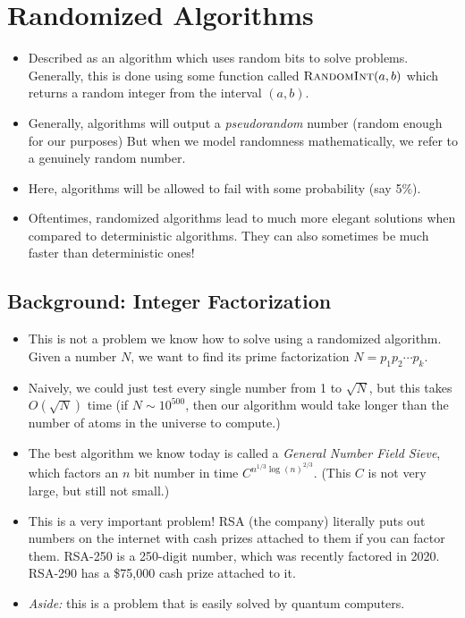 \section{Randomized Algorithms} 
\begin{itemize}
	\item Described as an algorithm which uses random bits to solve problems. Generally, this is done 
		using some function called \( \textsc{RandomInt}(a, b) \) which returns a random integer from 
		the interval \( (a, b) \).
	\item Generally, algorithms will output a \textit{pseudorandom} number (random enough for our purposes) 
		But when we model randomness mathematically, we refer to a genuinely random number.  
	\item Here, algorithms will be allowed to fail with some probability (say 5\%).
	\item Oftentimes, randomized algorithms lead to much more elegant solutions when compared to deterministic 
		algorithms. They can also sometimes be much faster than deterministic ones!
\end{itemize}
\subsection{Background: Integer Factorization}
\begin{itemize}
	\item This is not a problem we know how to solve using a randomized algorithm. Given a number \( N \), 
		we want to find its prime factorization \( N = p_1p_2\cdots p_k \). 
	\item Naively, we could just test every single number from 1 to \( \sqrt{N}  \), but this takes 
		\( O(\sqrt{N} ) \) time (if \( N \sim 10^{500} \), then our algorithm would take longer than the number 
		of atoms in the universe to compute.)
	\item The best algorithm we know today is called a \textit{General Number Field Sieve}, which factors 
		an \( n \) bit number in time \( C^{n^{1 / 3}\log(n)^{2 / 3}} \). (This \( C \) is not very large, but 
		still not small.) 
	\item This is a very important problem! RSA (the company) literally puts out numbers on the internet with 
		cash prizes attached to them if you can factor them. RSA-250 is a 250-digit number, which was 
		recently factored in 2020. RSA-290 has a \$75,000 cash prize attached to it.
	\item \textit{Aside:} this is a problem that is easily solved by quantum computers.  
\end{itemize}

